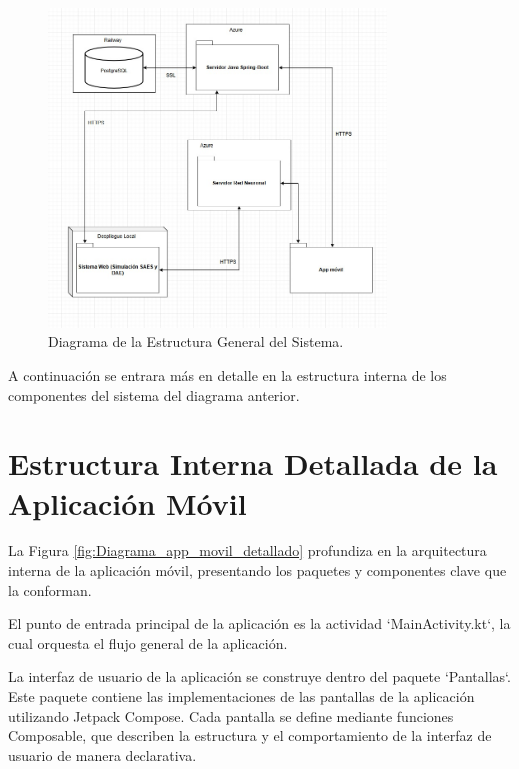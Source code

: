 

\begin{figure}[htbp!]
	\begin{center}
		\includegraphics[width=0.8\textwidth]{images/DiagramaGeneralClases}
		\caption{Diagrama de la Estructura General del Sistema.}
		\label{fig:Diagrama de sistemas}
	\end{center}
\end{figure}

A continuación se entrara más en detalle en la estructura interna de los componentes del sistema del diagrama anterior.

\newpage

\section{Estructura Interna Detallada de la Aplicación Móvil} 

La Figura \ref{fig:Diagrama_app_movil_detallado} profundiza en la arquitectura interna de la aplicación móvil, presentando los paquetes y componentes clave que la conforman. 

El punto de entrada principal de la aplicación es la actividad `MainActivity.kt`, la cual orquesta el flujo general de la aplicación. 

La interfaz de usuario de la aplicación se construye dentro del paquete `Pantallas`. Este paquete contiene las implementaciones de las pantallas de la aplicación utilizando Jetpack Compose. Cada pantalla se define mediante funciones Composable, que describen la estructura y el comportamiento de la interfaz de usuario de manera declarativa. 

